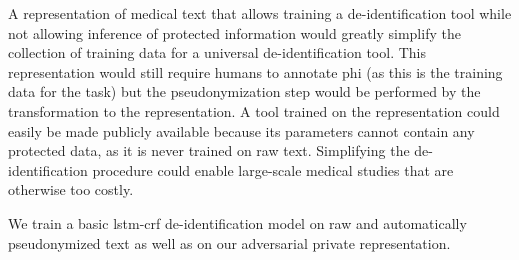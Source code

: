 %
A representation of medical text that allows training a de-identification tool while not allowing inference of protected information would greatly simplify the collection of training data for a universal de-identification tool.
%
This representation would still require humans to annotate \ac{phi} (as this is the training data for the task) but the pseudonymization step would be performed by the transformation to the representation.
%
A tool trained on the representation could easily be made publicly available because its parameters cannot contain any protected data, as it is never trained on raw text.
%
Simplifying the de-identification procedure could enable large-scale medical studies that are otherwise too costly.

We train a basic \acs{lstm}-\acs{crf} de-identification model on raw and automatically pseudonymized text as well as on our adversarial private representation.
%

